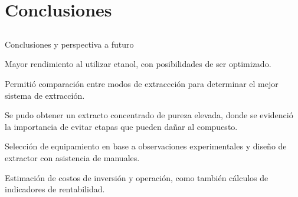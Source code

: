 \documentclass[aspectratio=1610]{beamer}
\newcommand{\titleframe}[1]{
\begin{frame} \null\hfill\huge{\shadowbox{#1}}\hspace{1cm} \end{frame}}
\newcommand{\ssec}{Título de subsección}
\begin{document}
\section{Conclusiones}
\renewcommand{\ssec}{}
\subsection{\ssec}
\begin{frame}
	\begin{block}{Conclusiones y perspectiva a futuro}
	\begin{description}[Experimentales]
	\item[Experimentales] Mayor rendimiento al utilizar etanol, con posibilidades de ser optimizado. 
	\item[Modelado] Permitió comparación entre modos de extraccción para determinar el mejor sistema de extracción. 
	\item[Purificación] Se pudo obtener un extracto concentrado de pureza elevada, donde se evidenció la importancia de evitar etapas que pueden dañar al compuesto.
	\item[Equipamiento] Selección de equipamiento en base a observaciones experimentales y diseño de extractor con asistencia de manuales.
	\item[Costos] Estimación de costos de inversión y operación, como también cálculos de indicadores de rentabilidad.
	\end{description}
	\end{block}
\end{frame}
\titleframe{¡Muchas gracias!}
\end{document}
